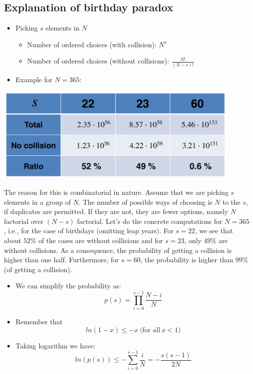 	\subsection{Explanation of birthday paradox}
		\begin{itemize}
			\item Picking $s$ elements in $N$
			\begin{itemize}
				\item Number of ordered choices (with collision): $N^s$
				\item Number of ordered choices (without collisions): $\frac{N!}{(N-s)!}$
			\end{itemize}
			\item Example for $N=365$:
		\end{itemize}
		\begin{center}
			\includegraphics[width=120mm]{Graphics/Hash Functions/hf14.png}
		\end{center}
		The reason for this is combinatorial in nature. 
		Assume that we are picking $s$ elements in a group of $N$. 
		The number of possible ways of choosing is $N$ to the $s$, if duplicates are permitted. 
		If they are not, they are fewer options, namely $N$ factorial over $(N-s)$ factorial.
		Let’s do the concrete computations for $N=365$, i.e., for the case of birthdays (omitting leap years). 
		For $s=22$, we see that about $52\%$ of the cases are without collisions and for $s=23$, only $49\%$ are without collisions. 
		As a consequence, the probability of getting a collision is higher than one half. 
		Furthermore, for $s=60$, the probability is higher than $99\%$ (of getting a collision).
		\begin{itemize}
			\item We can simplify the probability as:
				$$p(s) = \prod\limits_{i=0}^{s-1} \frac{N-i}{N}$$
			\item Remember that
				$$ln(1-x) \leq -x \  \text{(for all} \  x<1 \text{)}$$
			\item Taking logarithm we have:
				$$ln(p(s)) \leq -\sum\limits_{i=0}^{s-1} \frac{i}{N} = -\frac{s(s-1)}{2N}$$
		\end{itemize}
